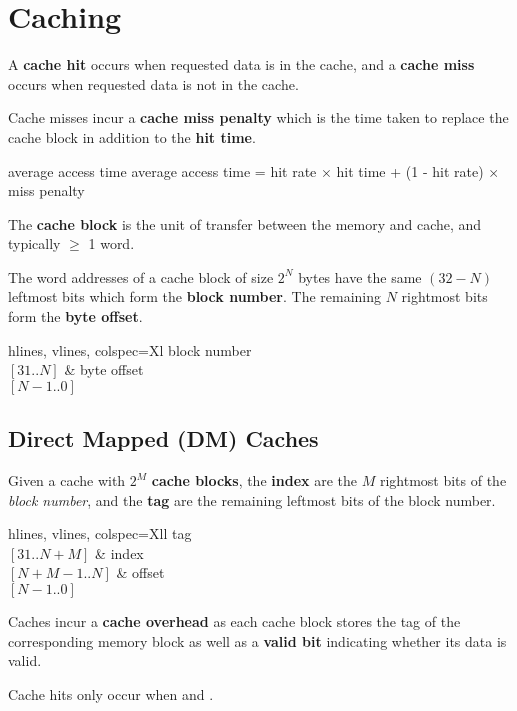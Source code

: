 \section{Caching}
A \textbf{cache hit} occurs when requested data is in the cache, and a
\textbf{cache miss} occurs when requested data is not in the cache.

Cache misses incur a \textbf{cache miss penalty} which is the time taken to
replace the cache block in addition to the \textbf{hit time}.

\begin{defn}{average access time}
    average access time = hit rate $\times$ hit time + (1 - hit rate) $\times$ miss penalty
\end{defn}

The \textbf{cache block} is the unit of transfer between the memory and cache,
and typically $\geq$ 1 word.

The word addresses of a cache block of size $2^N$ bytes have the same $(32 - N)$ leftmost bits
which form the \textbf{block number}. The remaining $N$ rightmost bits form the
\textbf{byte offset}.

\begin{tblr}{hlines, vlines, colspec={Xl}}
    { block number \\ $[31..N]$ } & { byte offset \\ $[N-1..0]$ }
\end{tblr}


\subsection{Direct Mapped (DM) Caches}
Given a cache with $2^M$ \textbf{cache blocks}, the \textbf{index} are the $M$ rightmost bits
of the \textit{block number}, and the \textbf{tag} are the remaining leftmost bits of the block number.

\begin{tblr}{hlines, vlines, colspec={Xll}}
    { tag \\ $[31..N+M]$ } & { index \\  $[N+M-1..N]$ } & { offset \\ $[N-1..0]$ } \\
\end{tblr}

Caches incur a \textbf{cache overhead} as each cache block stores the tag of the corresponding memory
block as well as a \textbf{valid bit} indicating whether its data is valid.

Cache hits only occur when  and .

